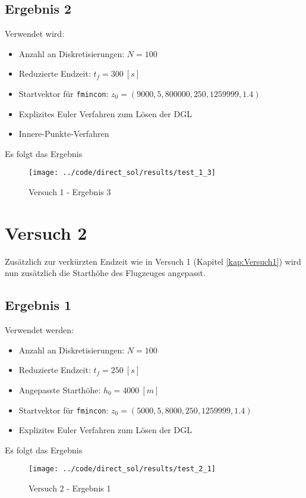 \newpage
\subsection{Ergebnis 2}\label{kap:Versuch13}
Verwendet wird:
\begin{itemize}
\item Anzahl an Diskretisierungen: $N = 100$ 
\item Reduzierte Endzeit: $t_f = 300 \ [s]$
\item Startvektor für \texttt{fmincon}: $z_0 = (9000,5,800000,250,1259999,1.4)$
\item Explizites Euler Verfahren zum Lösen der DGL
%
\item Innere-Punkte-Verfahren
\end{itemize}
Es folgt das Ergebnis
\begin{figure}[H]
\begin{center}
\texttt{[image: ../code/direct\_sol/results/test\_1\_3]}
\caption{Versuch 1 - Ergebnis 3}\label{img:test_1_3}
\end{center}
\end{figure}















\newpage
\section{Versuch 2}\label{kap:Versuch2}
Zusätzlich zur verkürzten Endzeit wie in Versuch 1 (Kapitel \ref{kap:Versuch1}) wird nun zusätzlich die Starthöhe des Flugzeuges angepasst.

\subsection{Ergebnis 1}\label{kap:Versuch21}
Verwendet werden:
\begin{itemize}
\item Anzahl an Diskretisierungen: $N = 100$ 
\item Reduzierte Endzeit: $t_f = 250 \ [s]$
\item Angepasste Starthöhe: $h_0 = 4000 \ [m]$
\item Startvektor für \texttt{fmincon}: $z_0 = (5000,5,8000,250,1259999,1.4)$
\item Explizites Euler Verfahren zum Lösen der DGL
\end{itemize}
Es folgt das Ergebnis
\begin{figure}[H]
\begin{center}
\texttt{[image: ../code/direct\_sol/results/test\_2\_1]}
\caption{Versuch 2 - Ergebnis 1}\label{img:test_2_1}
\end{center}
\end{figure}

